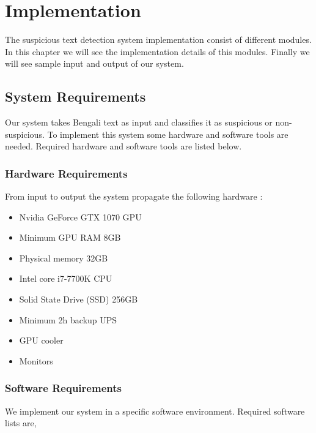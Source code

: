 \chapter{Implementation}
\thispagestyle{empty}
The suspicious text detection system implementation consist of different modules. In this chapter we will see the implementation details of this modules. Finally we will see sample input and output of our system.

\section{System Requirements}
Our system takes Bengali text as input and classifies it as suspicious or non-suspicious. To implement this system some hardware and software tools are needed. Required hardware and software tools are listed below.
\subsection{Hardware Requirements}
From input to output the system propagate the following hardware :
\begin{itemize}
    \item Nvidia GeForce GTX 1070 GPU
    \item Minimum GPU RAM 8GB
    \item Physical memory 32GB
    \item Intel core i7-7700K CPU
    \item Solid State Drive (SSD) 256GB
    \item Minimum 2h backup UPS
    \item GPU cooler
    \item Monitors
\end{itemize}
\clearpage
\subsection{Software Requirements}
We implement our system in a specific software environment. Required software lists are,

